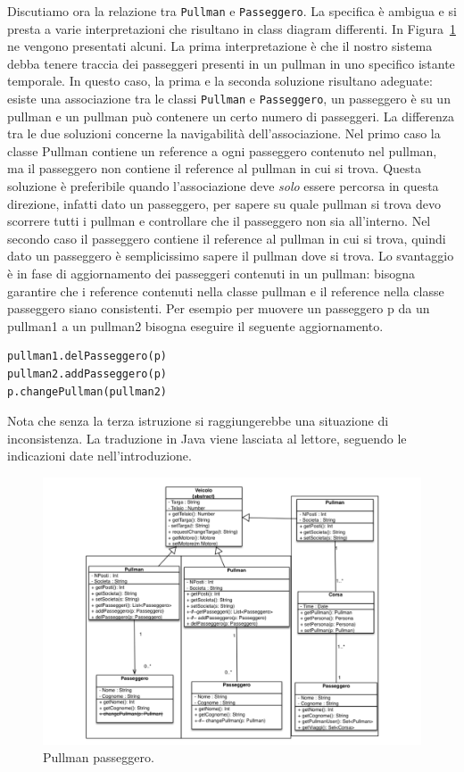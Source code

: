\documentclass{article}
\begin{document}
Discutiamo ora la relazione tra \texttt{Pullman} e \texttt{Passeggero}. La specifica \`e ambigua e si presta a varie interpretazioni che risultano in class diagram differenti. In Figura~\ref{Fig:pullmanPasseggero} ne vengono presentati alcuni. La prima interpretazione \`e che il nostro sistema debba tenere traccia dei passeggeri presenti in un pullman in uno specifico istante temporale. In questo caso, la prima e la seconda soluzione risultano adeguate: esiste una associazione tra le classi \texttt{Pullman} e \texttt{Passeggero}, un passeggero \`e su un pullman e un pullman pu\`o contenere un certo numero di passeggeri. La differenza tra le due soluzioni concerne la navigabilit\`a dell'associazione. Nel primo caso la classe Pullman contiene un reference a ogni passeggero contenuto nel pullman, ma il passeggero non contiene il reference al pullman in cui si trova. Questa soluzione \`e preferibile quando l'associazione deve \emph{solo} essere percorsa in questa direzione, infatti dato un passeggero, per sapere su quale pullman si trova devo scorrere tutti i pullman e controllare che il passeggero non sia all'interno. Nel secondo caso il passeggero contiene il reference al pullman in cui si trova, quindi dato un passeggero \`e semplicissimo sapere il pullman dove si trova. Lo svantaggio \`e in fase di aggiornamento dei passeggeri contenuti in un pullman: bisogna garantire che i reference contenuti nella classe pullman e il reference nella classe passeggero siano consistenti. Per esempio per muovere un passeggero p da un pullman1 a un pullman2 bisogna eseguire il seguente aggiornamento.

\begin{lstlisting}
pullman1.delPasseggero(p)
pullman2.addPasseggero(p)
p.changePullman(pullman2)
\end{lstlisting}

Nota che senza la terza istruzione si raggiungerebbe una situazione di inconsistenza. La traduzione in Java viene lasciata al lettore, seguendo le indicazioni date nell'introduzione.

\begin{figure}[h!]
  \centering
    \includegraphics[width=1\textwidth]{Img/pullmanpasseggero.pdf}
      \caption{Pullman passeggero.}
      \label{Fig:pullmanPasseggero}
\end{figure}
\end{document}
